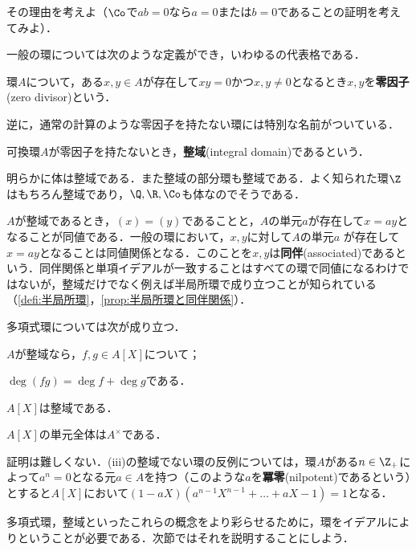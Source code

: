 \begin{exer}
	その理由を考えよ（$\Co$で$ab=0$なら$a=0$または$b=0$であることの証明を考えてみよ）．
\end{exer}

一般の環については次のような定義ができ，いわゆるの代表格である．

\begin{defi}[零因子]
	環$A$について，ある$x,y\in A$が存在して$xy=0$かつ$x,y\neq0$となるとき$x,y$を\textbf{零因子}(zero divisor)という．
\end{defi}

逆に，通常の計算のような零因子を持たない環には特別な名前がついている．

\begin{defi}[整域]
	可換環$A$が零因子を持たないとき，\textbf{整域}(integral domain)であるという．
\end{defi}

明らかに体は整域である．また整域の部分環も整域である．よく知られた環$\Z$はもちろん整域であり，$\Q,\R,\Co$も体なのでそうである．

$A$が整域であるとき，$(x)=(y)$であることと，$A$の単元$a$が存在して$x=ay$となることが同値である．一般の環において，$x,y$に対して$A$の単元$a$
が存在して$x=ay$となることは同値関係となる．このことを$x,y$は\textbf{同伴}(associated)であるという．同伴関係と単項イデアルが一致することはすべての環で同値になるわけではないが，整域だけでなく例えば半局所環で成り立つことが知られている（\ref{defi:半局所環}，\ref{prop:半局所環と同伴関係}）．

多項式環については次が成り立つ．

\begin{prop}
	$A$が整域なら，$f,g\in A[X]$について；
	\begin{sakura}
		\item $\deg(fg)=\deg f+\deg g$である．
		\item $A[X]$は整域である．
		\item $A[X]$の単元全体は$A^\times$である．
	\end{sakura}
\end{prop}

証明は難しくない．(iii)の整域でない環の反例については，環$A$がある$n\in\Z_+$によって$a^n=0$となる元$a\in A$を持つ（このような$a$を\textbf{冪零}(nilpotent)であるという）とすると$A[X]$において$(1-aX)(a^{n-1}X^{n-1}+\dots+aX-1)=1$となる．

多項式環，整域といったこれらの概念をより彩らせるために，環をイデアルによりということが必要である．次節ではそれを説明することにしよう．

